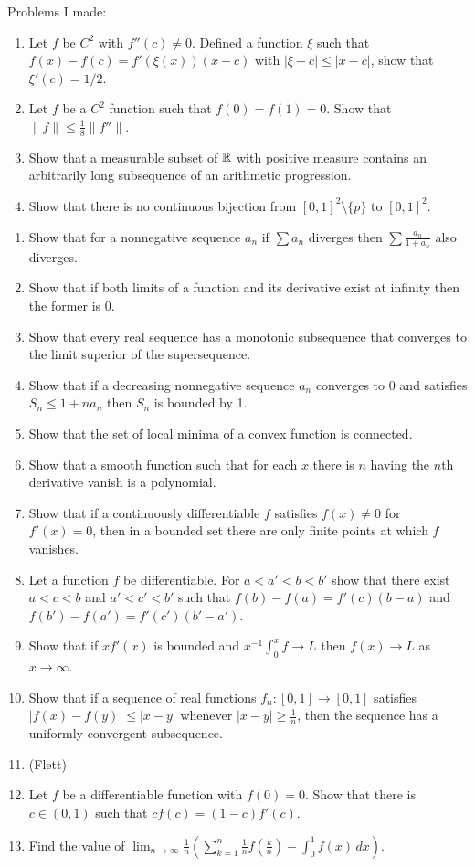 \documentclass[11pt]{article}
\begin{document}
Problems I made:
\begin{enumerate}
\item Let $f$ be $C^2$ with $f''(c)\ne0$. Defined a function $\xi$ such that $f(x)-f(c)=f'(\xi(x))(x-c)$ with $|\xi-c|\le|x-c|$, show that $\xi'(c)=1/2$.
\item Let $f$ be a $C^2$ function such that $f(0)=f(1)=0$. Show that $\|f\|\le\frac18\|f''\|$.
\item Show that a measurable subset of $\mathbb{R}$ with positive measure contains an arbitrarily long subsequence of an arithmetic progression.
\item Show that there is no continuous bijection from $[0,1]^2\setminus\{p\}$ to $[0,1]^2$. %
\end{enumerate}
\bigskip
\begin{enumerate}
\item Show that for a nonnegative sequence $a_n$ if $\sum a_n$ diverges then $\sum\frac{a_n}{1+a_n}$ also diverges.
\item Show that if both limits of a function and its derivative exist at infinity then the former is 0.
\item Show that every real sequence has a monotonic subsequence that converges to the limit superior of the supersequence.
\item Show that if a decreasing nonnegative sequence $a_n$ converges to 0 and satisfies $S_n\le1+na_n$ then $S_n$ is bounded by 1.
\item Show that the set of local minima of a convex function is connected.
\item Show that a smooth function such that for each $x$ there is $n$ having the $n$th derivative vanish is a polynomial.
\item Show that if a continuously differentiable $f$ satisfies $f(x)\ne0$ for $f'(x)=0$, then in a bounded set there are only finite points at which $f$ vanishes.
\item Let a function $f$ be differentiable. For $a<a'<b<b'$ show that there exist $a<c<b$ and $a'<c'<b'$ such that $f(b)-f(a)=f'(c)(b-a)$ and $f(b')-f(a')=f'(c')(b'-a')$.
\item Show that if $xf'(x)$ is bounded and $x^{-1}\int_0^xf\to L$ then $f(x)\to L$ as $x\to\infty$.
\item Show that if a sequence of real functions $f_n\colon[0,1]\to[0,1]$ satisfies $|f(x)-f(y)|\le|x-y|$ whenever $|x-y|\ge\frac1n$, then the sequence has a uniformly convergent subsequence.
\item (Flett)
\item Let $f$ be a differentiable function with $f(0)=0$. Show that there is $c\in(0,1)$ such that $cf(c)=(1-c)f'(c)$.
\item Find the value of $\lim_{n\to\infty}\frac1n\left(\sum_{k=1}^n\frac1nf\left(\frac kn\right)-\int_0^1f(x)\,dx\right)$.


\end{enumerate}
\end{document}
